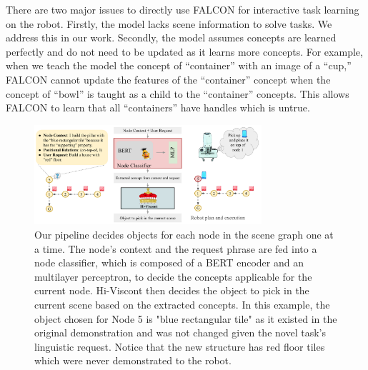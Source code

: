  

There are two major issues to directly use FALCON for interactive task learning on the robot. Firstly, the model lacks scene information to solve tasks. We address this in our work. Secondly, the model assumes concepts are learned perfectly and do not need to be updated as it learns more concepts.
For example, when we teach the model the concept of ``container'' with an image of a ``cup,'' FALCON cannot update the features of the ``container'' concept when the concept of ``bowl'' is taught as a child to the ``container'' concepts. This allows FALCON to learn that all ``containers'' have handles which is untrue.
\begin{figure}[h]
    \centering
    \includegraphics[width=0.75\textwidth]{figures/pipeline_fig.pdf}
    \caption{Our pipeline decides objects for each node in the scene graph one at a time. The node's context and the request phrase are fed into a node classifier, which is composed of a BERT encoder and an multilayer perceptron, to decide the concepts applicable for the current node. Hi-Viscont then decides the object to pick in the current scene based on the extracted concepts. In this example, the object chosen for Node 5 is "blue rectangular tile" as it existed in the original demonstration and was not changed given the novel task's linguistic request. Notice that the new structure has red floor tiles which were never demonstrated to the robot.}
    \label{fig:node_classifier}
\end{figure}

